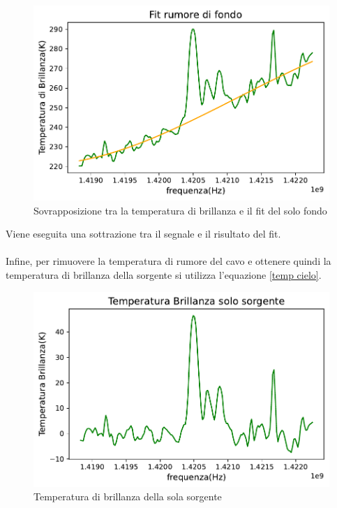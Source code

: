 \begin{figure}[H]
	\centering
	\includegraphics[scale=0.8]{Fit rumore di fondo.pdf}
	\caption{Sovrapposizione tra la temperatura di brillanza e il fit del solo fondo}
    	\label{fig:Fit rumore di fondo}
\end{figure}

Viene eseguita una sottrazione tra il segnale e il risultato del fit.
\\\\
Infine, per rimuovere la temperatura di rumore del cavo e ottenere quindi la temperatura di brillanza della sorgente si utilizza l'equazione \eqref{temp cielo}.

\begin{figure}[H]
	\centering
	\includegraphics[scale=0.8]{Temperatura_finale.pdf}
	\caption{Temperatura di brillanza della sola sorgente}
    	\label{fig:Temperatura_finale}
\end{figure}

